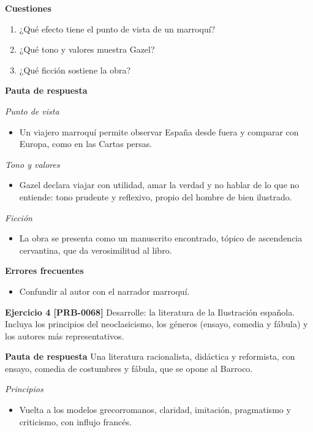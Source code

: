 \documentclass{book}
\begin{document}
\noindent\textbf{Cuestiones}
\begin{enumerate}
\item ¿Qué efecto tiene el punto de vista de un marroquí?
\item ¿Qué tono y valores muestra Gazel?
\item ¿Qué ficción sostiene la obra?
\end{enumerate}

\noindent\textbf{Pauta de respuesta}

\noindent\textit{Punto de vista}
\begin{itemize}
\item Un viajero marroquí permite observar España desde fuera y comparar con Europa, como en las Cartas persas.
\end{itemize}

\noindent\textit{Tono y valores}
\begin{itemize}
\item Gazel declara viajar con utilidad, amar la verdad y no hablar de lo que no entiende: tono prudente y reflexivo, propio del hombre de bien ilustrado.
\end{itemize}

\noindent\textit{Ficción}
\begin{itemize}
\item La obra se presenta como un manuscrito encontrado, tópico de ascendencia cervantina, que da verosimilitud al libro.
\end{itemize}

\noindent\textbf{Errores frecuentes}
\begin{itemize}
\item Confundir al autor con el narrador marroquí.
\end{itemize}

\noindent\textbf{Ejercicio 4 [PRB-0068]}
Desarrolle: la literatura de la Ilustración española. Incluya los principios del neoclasicismo, los géneros (ensayo, comedia y fábula) y los autores más representativos.


\noindent\textbf{Pauta de respuesta}
Una literatura racionalista, didáctica y reformista, con ensayo, comedia de costumbres y fábula, que se opone al Barroco.


\noindent\textit{Principios}
\begin{itemize}
\item Vuelta a los modelos grecorromanos, claridad, imitación, pragmatismo y criticismo, con influjo francés.
\end{itemize}
\end{document}
